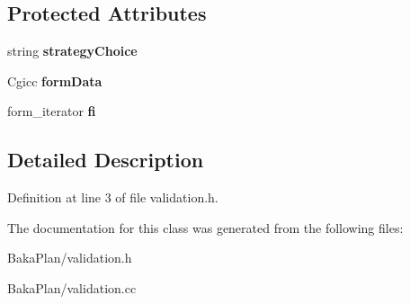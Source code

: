 \subsection*{Protected Attributes}
\begin{DoxyCompactItemize}
\item 
\hypertarget{classValidation_a1313f03a0092ea1d882a60fecaa58e67}{string {\bfseries strategy\-Choice}}\label{classValidation_a1313f03a0092ea1d882a60fecaa58e67}

\item 
\hypertarget{classValidation_a4224a467d43a9df314a78ee22061d8d6}{Cgicc {\bfseries form\-Data}}\label{classValidation_a4224a467d43a9df314a78ee22061d8d6}

\item 
\hypertarget{classValidation_abc319ff9dba2f9d78f68a825c345d093}{form\-\_\-iterator {\bfseries fi}}\label{classValidation_abc319ff9dba2f9d78f68a825c345d093}

\end{DoxyCompactItemize}


\subsection{Detailed Description}


Definition at line 3 of file validation.\-h.



The documentation for this class was generated from the following files\-:\begin{DoxyCompactItemize}
\item 
Baka\-Plan/validation.\-h\item 
Baka\-Plan/validation.\-cc\end{DoxyCompactItemize}
